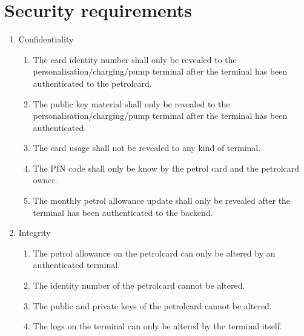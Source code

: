 
\section{Security requirements}
\begin{enumerate}
\item Confidentiality
	\begin{enumerate}
	\item The card identity number shall only be revealed to the  personalisation/charging/pump terminal after the terminal has been authenticated to the petrolcard.
	\item The public key material shall only be revealed to the personalisation/charging/pump terminal after the terminal has been authenticated.
	\item The card usage shall not be revealed to any kind of terminal.
	\item The PIN code shall only be know by the petrol card and the petrolcard owner. 
	\item The monthly petrol allowance update shall only be revealed after the terminal has been authenticated to the backend. 
	\end{enumerate}
\item Integrity
	\begin{enumerate}
	\item The petrol allowance on the petrolcard can only be altered by an authenticated terminal.
	\item The identity number of the petrolcard cannot be altered. 
	\item The public and private keys of the petrolcard cannot be altered.
	\item The logs on the terminal can only be altered by the terminal itself. 
	\end{enumerate}


\end{enumerate}

